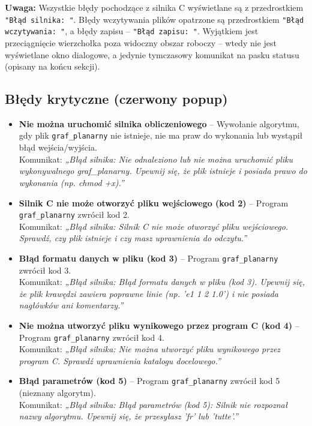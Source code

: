 \documentclass[a4paper, 11pt]{article}
\begin{document}
\textbf{Uwaga:} Wszystkie błędy pochodzące z silnika C wyświetlane są z przedrostkiem \texttt{"Błąd silnika: "}. Błędy wczytywania plików opatrzone są przedrostkiem \texttt{"Błąd wczytywania: "}, a błędy zapisu – \texttt{"Błąd zapisu: "}. Wyjątkiem jest przeciągnięcie wierzchołka poza widoczny obszar roboczy – wtedy nie jest wyświetlane okno dialogowe, a jedynie tymczasowy komunikat na pasku statusu (opisany na końcu sekcji).

\subsection*{Błędy krytyczne (czerwony popup)}

\begin{itemize}
  \item \textbf{Nie można uruchomić silnika obliczeniowego} – Wywołanie algorytmu, gdy plik \texttt{graf\_planarny} nie istnieje, nie ma praw do wykonania lub wystąpił błąd wejścia/wyjścia.\\
  Komunikat: \textit{„Błąd silnika: Nie odnaleziono lub nie można uruchomić pliku wykonywalnego graf\_planarny. Upewnij się, że plik istnieje i posiada prawo do wykonania (np. chmod +x).”}

  \item \textbf{Silnik C nie może otworzyć pliku wejściowego (kod 2)} – Program \texttt{graf\_planarny} zwrócił kod 2.\\
  Komunikat: \textit{„Błąd silnika: Silnik C nie może otworzyć pliku wejściowego. Sprawdź, czy plik istnieje i czy masz uprawnienia do odczytu.”}

  \item \textbf{Błąd formatu danych w pliku (kod 3)} – Program \texttt{graf\_planarny} zwrócił kod 3.\\
  Komunikat: \textit{„Błąd silnika: Błąd formatu danych w pliku (kod 3). Upewnij się, że plik krawędzi zawiera poprawne linie (np. 'e1 1 2 1.0') i nie posiada nagłówków ani komentarzy.”}

  \item \textbf{Nie można utworzyć pliku wynikowego przez program C (kod 4)} – Program \texttt{graf\_planarny} zwrócił kod 4.\\
  Komunikat: \textit{„Błąd silnika: Nie można utworzyć pliku wynikowego przez program C. Sprawdź uprawnienia katalogu docelowego.”}

  \item \textbf{Błąd parametrów (kod 5)} – Program \texttt{graf\_planarny} zwrócił kod 5 (nieznany algorytm).\\
  Komunikat: \textit{„Błąd silnika: Błąd parametrów (kod 5): Silnik nie rozpoznał nazwy algorytmu. Upewnij się, że przesyłasz 'fr' lub 'tutte'.”}


\end{itemize}
\end{document}

